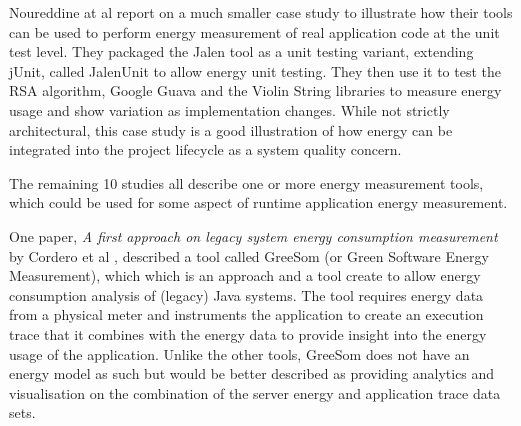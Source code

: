 Noureddine at al report on a much smaller case study to illustrate how their tools can be used to perform energy measurement of real application code at the unit test level.  They packaged the Jalen tool as a unit testing variant, extending jUnit, called JalenUnit to allow energy unit testing.  They then use it to test the RSA algorithm, Google Guava and the Violin String libraries to measure energy usage and show variation as implementation changes.  While not strictly architectural, this case study is a good illustration of how energy can be integrated into the project lifecycle as a system quality concern.

The remaining 10 studies all describe one or more energy measurement tools, which could be used for some aspect of runtime application energy measurement.

One paper, \emph{A first approach on legacy system energy consumption measurement} by Cordero et al \cite{cordero2015-legacyenergy}, described a tool called GreeSom (or Green Software Energy Measurement), which which is an approach and a tool create to allow energy consumption analysis of (legacy) Java systems.  The tool requires energy data from a physical meter and instruments the application to create an execution trace that it combines with the energy data to provide insight into the energy usage of the application.  Unlike the other tools, GreeSom does not have an energy model as such but would be better described as providing analytics and visualisation on the combination of the server energy and application trace data sets. 

